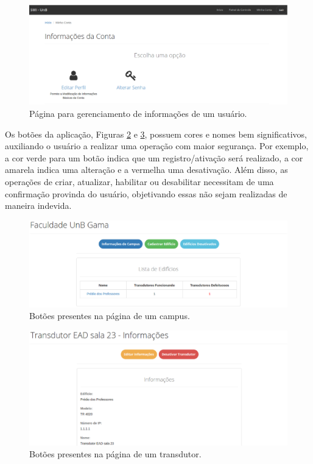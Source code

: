 \begin{figure}[!h]
    \centering
    \includegraphics[scale=0.35]{figuras/my_account.eps}
    \caption{Página para gerenciamento de informações de um usuário.}
    \label{my_account}
\end{figure}

Os botões da aplicação, Figuras \ref{buttons} e \ref{buttons_2}, possuem cores e nomes bem significativos, auxiliando o usuário a realizar uma operação com maior segurança. Por exemplo, a cor verde para um botão indica que um registro/ativação será realizado, a cor amarela indica uma alteração e a vermelha uma desativação. Além disso, as operações de criar, atualizar, habilitar ou desabilitar necessitam de uma confirmação provinda do usuário, objetivando essas não sejam realizadas de maneira indevida.

\begin{figure}[!h]
    \centering
    \includegraphics[scale=0.4]{figuras/buttons.eps}
    \caption{Botões presentes na página de um campus.}
    \label{buttons}
\end{figure}

\begin{figure}[!h]
    \centering
    \includegraphics[scale=0.4]{figuras/buttons_2.eps}
    \caption{Botões presentes na página de um transdutor.}
    \label{buttons_2}
\end{figure}

